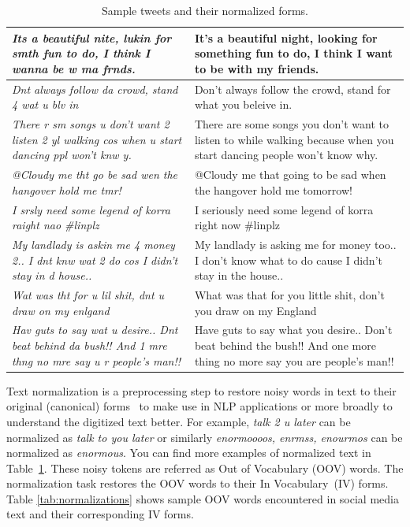 \documentclass[a4paper,onesided,12pt]{report}
\begin{document}
\begin{table}[hbp]
\caption[Sample tweets and their normalized forms.]{Sample tweets and their normalized forms.}
\label{tab:sentences}
\begin{tabular}{|>{\itshape}p{7cm}|p{7cm}|}
\hline
Its a beautiful nite, lukin for smth fun to do, I think I wanna be w ma frnds. &
It’s a beautiful night, looking for something fun to do, I think I want to be with my friends. \\
\hline
Dnt always follow da crowd, stand 4 wat u blv in &
Don't always follow the crowd, stand for what you beleive in. \\
\hline
There r sm songs u don't want 2 listen 2 yl walking cos when u start dancing ppl won't knw y. &
There are some songs you don't want to listen to while walking because when you start dancing people won't know why. \\
\hline
@Cloudy me tht go be sad wen the hangover hold me tmr! &

@Cloudy me that going to be sad when the hangover hold me tomorrow! \\
\hline
I srsly need some legend of korra raight nao \#linplz &
I seriously need some legend of korra right now \#linplz \\
\hline
My landlady is askin me 4 money 2.. I dnt knw wat 2 do cos I didn't stay in d house.. &
My landlady is asking me for money too.. I don’t know what to do cause I didn't stay in the house.. \\ \hline
Wat was tht for u lil shit, dnt u draw on my enlgand &
What was that for you little shit, don’t you draw on my England \\ \hline
Hav guts to say wat u desire.. Dnt beat behind da bush!! And 1 mre thng no mre say u r people's man!! &
Have guts to say what you desire.. Don’t beat behind the bush!! And one more thing no more say you are people's man!! \\
\hline
\end{tabular}
\end{table}

Text normalization is a preprocessing step to restore noisy words in text to their original (canonical) forms~\cite{Han:2011:LNS:2002472.2002520} to make use in NLP applications or more broadly to understand the digitized text better. For example, \textit{talk 2 u later} can be normalized as \textit{talk to you later} or similarly \textit{enormoooos, enrmss, enourmos} can be normalized as \textit{enormous}. You can find more examples of normalized text in Table~\ref{tab:sentences}. These noisy tokens are referred as Out of Vocabulary (OOV) words. The normalization task restores the OOV words to their In Vocabulary~(IV) forms. Table \ref{tab:normalizations} shows sample OOV words encountered in social media text and their corresponding IV forms.
\end{document}
